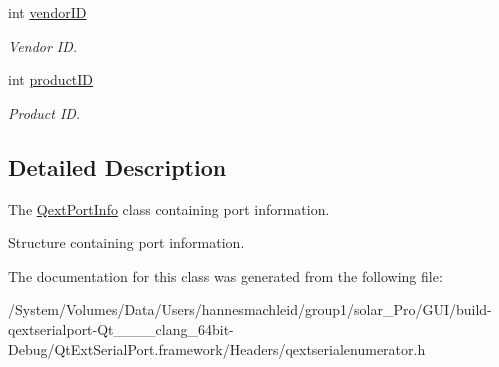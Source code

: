 \begin{DoxyCompactItemize}
\mbox{\label{struct_qext_port_info_a00aeecc4e947e0ba034467b89e7c5fc4}} 
int \mbox{\hyperlink{struct_qext_port_info_a00aeecc4e947e0ba034467b89e7c5fc4}{vendor\+ID}}
\begin{DoxyCompactList}\small\item\em Vendor ID. \end{DoxyCompactList}\item 
\mbox{\label{struct_qext_port_info_ad8ac5d0d6c74f8f7c3e8fcf9ea9bd0fb}} 
int \mbox{\hyperlink{struct_qext_port_info_ad8ac5d0d6c74f8f7c3e8fcf9ea9bd0fb}{product\+ID}}
\begin{DoxyCompactList}\small\item\em Product ID. \end{DoxyCompactList}\end{DoxyCompactItemize}


\subsection{Detailed Description}
The \mbox{\hyperlink{struct_qext_port_info}{Qext\+Port\+Info}} class containing port information. 

Structure containing port information.


\begin{DoxyCode}{0}
\end{DoxyCode}
 

The documentation for this class was generated from the following file\+:\begin{DoxyCompactItemize}
\item 
/\+System/\+Volumes/\+Data/\+Users/hannesmachleid/group1/solar\+\_\+\+Pro/\+G\+U\+I/build-\/qextserialport-\/\+Qt\+\_\+\_\+\_\+\_\+clang\+\_\+64bit-\/\+Debug/\+Qt\+Ext\+Serial\+Port.\+framework/\+Headers/qextserialenumerator.\+h\end{DoxyCompactItemize}
